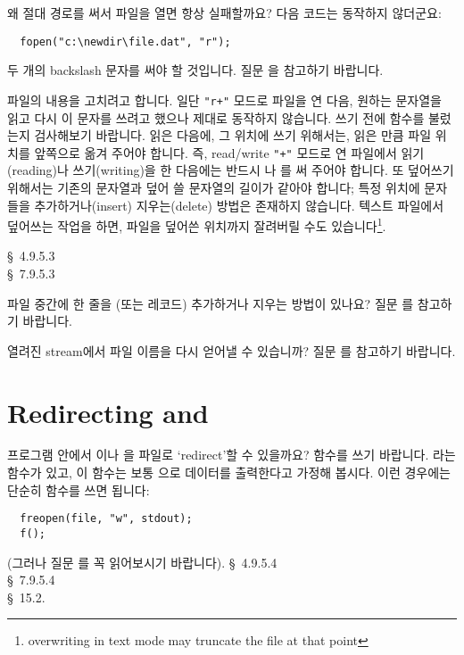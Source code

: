 \begin{faq}
	왜 절대 경로를 써서 파일을 열면 항상 실패할까요?
	다음 코드는 동작하지 않더군요:
\begin{verbatim}
  fopen("c:\newdir\file.dat", "r");
\end{verbatim}

\A
	두 개의 backslash 문자를 써야 할 것입니다.
	질문 을 참고하기 바랍니다.
\end{faq}

\begin{faq}
	파일의 내용을 고치려고 합니다.  일단 \verb?"r+"? 모드로 파일을 연 다음,
	원하는 문자열을 읽고 다시 이 문자를 쓰려고 했으나 제대로 동작하지
	않습니다.
\A
	쓰기 전에  함수를 불렀는지 검사해보기 바랍니다.
	읽은 다음에, 그 위치에 쓰기 위해서는, 읽은 만큼 파일 위치를 앞쪽으로
	옮겨 주어야
	합니다.  즉, read/write \verb-"+"- 모드로 연 파일에서 읽기(reading)나 
	쓰기(writing)을 한 다음에는 반드시 나 를 써 주어야
	합니다.
	또 덮어쓰기 위해서는 기존의 문자열과 덮어 쓸 문자열의 길이가 같아야
	합니다; 특정 위치에 문자들을 추가하거나(insert) 지우는(delete) 방법은
	존재하지 않습니다.
	텍스트 파일에서 덮어쓰는 작업을 하면, 파일을 덮어쓴 위치까지
	잘려버릴 수도
	있습니다\footnote{overwriting in text mode may truncate the file
	at that point}.  

\R
	\cite{ansi} \S\ 4.9.5.3 \\
	\cite{c89} \S\ 7.9.5.3
\end{faq}

\begin{faq}
	파일 중간에 한 줄을 (또는 레코드) 추가하거나 지우는 방법이
	있나요?
\A
	질문 를 참고하기 바랍니다.
\end{faq}

\begin{faq}
	열려진 stream에서 파일 이름을 다시 얻어낼 수 있습니까?
\A
	질문 를 참고하기 바랍니다.
\end{faq}

\section{Redirecting  and }	\label{sec:redirect}

\begin{faq}
	프로그램 안에서 이나 을 
	파일로 `redirect'할 수 있을까요?
\A
	 함수를 쓰기 바랍니다.
	라는 함수가 있고, 이 함수는 보통 으로
	데이터를 출력한다고 가정해 봅시다.  이런 경우에는
	단순히  함수를 쓰면 됩니다:

\begin{verbatim}
  freopen(file, "w", stdout);
  f();
\end{verbatim}

	(그러나 질문 를 꼭	읽어보시기 바랍니다).
\R
	\cite{ansi} \S\ 4.9.5.4 \\
	\cite{c89} \S\ 7.9.5.4 \\
	\cite{hs} \S\ 15.2. 
\end{faq}

